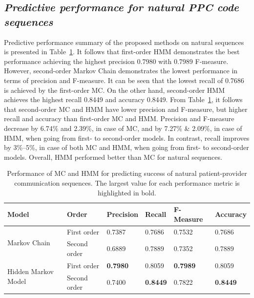 \documentclass{amia}
\begin{document}
\subsection*{\textit{Predictive performance for natural PPC code sequences}}
Predictive performance summary of the proposed methods on natural sequences is presented in Table~\ref{tab:result_norm_seq}. It follows that first-order HMM demonstrates the best performance achieving the highest precision 0.7980 with 0.7989 F-measure. However, second-order Markov Chain demonstrates the lowest performance in terms of precision and F-measure. It can be seen that the lowest recall of 0.7686 is achieved by the first-order MC. On the other hand, second-order HMM achieves the highest recall 0.8449 and accuracy 0.8449. From Table~\ref{tab:result_norm_seq}, it follows that second-order MC and HMM have lower precision and F-measure, but higher recall and accuracy than first-order MC and HMM. Precision and F-measure decrease by 6.74\% and 2.39\%, in case of MC, and by 7.27\% \& 2.09\%, in case of HMM, when going from first- to second-order models. In contrast, recall improves by 3\%--5\%, in case of both MC and HMM, when going from first- to second-order models. Overall, HMM performed better than MC for natural sequences. \\

\begin{table}[h]
\centering
\caption{Performance of MC and HMM for predicting success of natural patient-provider communication sequences. The largest value for each performance metric is highlighted in bold.}
\label{tab:result_norm_seq}
  \begin{tabular}{|l|l|l|l|l|l|}
  \hline
   \textbf{Model} & \textbf{Order}  & \textbf{Precision}  & \textbf{Recall} & \textbf{F-Measure} & \textbf{Accuracy}\\ \hline    
    
 \multirow{2}{*}{Markov Chain} & First order & 0.7387 & 0.7686 & 0.7532 & 0.7686\\\cline{2-6}
 & Second order & 0.6889 & 0.7889 & 0.7352 & 0.7889\\ \hline
 \multirow{2}{*}{Hidden Markov Model} & First order & \textbf{0.7980} & 0.8059 & \textbf{0.7989} & 0.8059\\ \cline{2-6}
 & Second order & 0.7400 & \textbf{0.8449} & 0.7822  & \textbf{0.8449}\\ \hline
 
  \end{tabular}
\end{table} 
\end{document}
